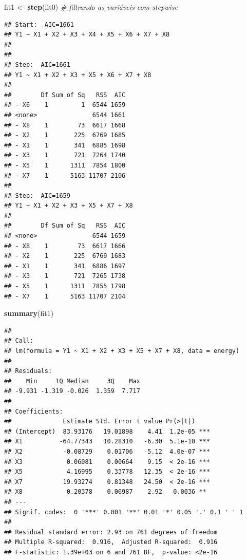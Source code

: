 \documentclass[
]{book}
\newenvironment{Shaded}{\begin{snugshade}}{\end{snugshade}}
\newcommand{\CommentTok}[1]{\textcolor[rgb]{0.56,0.35,0.01}{\textit{#1}}}
\newcommand{\KeywordTok}[1]{\textcolor[rgb]{0.13,0.29,0.53}{\textbf{#1}}}
\newcommand{\NormalTok}[1]{#1}
\newcommand{\StringTok}[1]{\textcolor[rgb]{0.31,0.60,0.02}{#1}}
\theoremstyle{definition}
\theoremstyle{definition}
\theoremstyle{definition}
\theoremstyle{remark}
\begin{document}
\begin{Shaded}
\begin{Highlighting}[]
\NormalTok{fit1 \textless{}{-}}\StringTok{ }\KeywordTok{step}\NormalTok{(fit0)  }\CommentTok{\# filtrando as variáveis com stepwise}
\end{Highlighting}
\end{Shaded}

\begin{verbatim}
## Start:  AIC=1661
## Y1 ~ X1 + X2 + X3 + X4 + X5 + X6 + X7 + X8
## 
## 
## Step:  AIC=1661
## Y1 ~ X1 + X2 + X3 + X5 + X6 + X7 + X8
## 
##        Df Sum of Sq   RSS  AIC
## - X6    1         1  6544 1659
## <none>               6544 1661
## - X8    1        73  6617 1668
## - X2    1       225  6769 1685
## - X1    1       341  6885 1698
## - X3    1       721  7264 1740
## - X5    1      1311  7854 1800
## - X7    1      5163 11707 2106
## 
## Step:  AIC=1659
## Y1 ~ X1 + X2 + X3 + X5 + X7 + X8
## 
##        Df Sum of Sq   RSS  AIC
## <none>               6544 1659
## - X8    1        73  6617 1666
## - X2    1       225  6769 1683
## - X1    1       341  6886 1697
## - X3    1       721  7265 1738
## - X5    1      1311  7855 1798
## - X7    1      5163 11707 2104
\end{verbatim}

\begin{Shaded}
\begin{Highlighting}[]
\KeywordTok{summary}\NormalTok{(fit1)}
\end{Highlighting}
\end{Shaded}

\begin{verbatim}
## 
## Call:
## lm(formula = Y1 ~ X1 + X2 + X3 + X5 + X7 + X8, data = energy)
## 
## Residuals:
##    Min     1Q Median     3Q    Max 
## -9.931 -1.319 -0.026  1.359  7.717 
## 
## Coefficients:
##              Estimate Std. Error t value Pr(>|t|)    
## (Intercept)  83.93176   19.01898    4.41  1.2e-05 ***
## X1          -64.77343   10.28310   -6.30  5.1e-10 ***
## X2           -0.08729    0.01706   -5.12  4.0e-07 ***
## X3            0.06081    0.00664    9.15  < 2e-16 ***
## X5            4.16995    0.33778   12.35  < 2e-16 ***
## X7           19.93274    0.81348   24.50  < 2e-16 ***
## X8            0.20378    0.06987    2.92   0.0036 ** 
## ---
## Signif. codes:  0 '***' 0.001 '**' 0.01 '*' 0.05 '.' 0.1 ' ' 1
## 
## Residual standard error: 2.93 on 761 degrees of freedom
## Multiple R-squared:  0.916,  Adjusted R-squared:  0.916 
## F-statistic: 1.39e+03 on 6 and 761 DF,  p-value: <2e-16
\end{verbatim}
\end{document}
